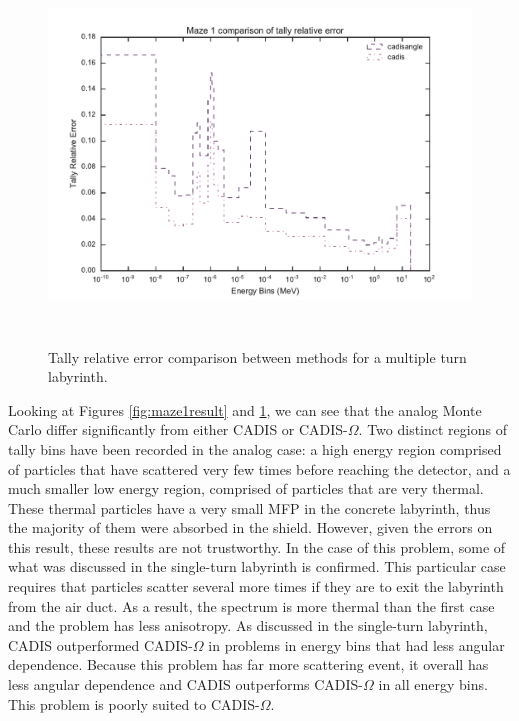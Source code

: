\begin{figure}[h!]
  \centering
  \includegraphics[height=10cm]{./chapters/characterization_probs/figures/char/maze1/maze_1_tally_error_compare.pdf}
  \caption[Tally relative error comparison between methods for multiple turn labyrinth]
  {Tally relative error comparison between methods for a multiple turn
  labyrinth. }
  \label{fig:maze1error}
\end{figure}

Looking at Figures \ref{fig:maze1result} and \ref{fig:maze1error}, we can see
that the analog Monte Carlo differ significantly from either CADIS or
CADIS-$\Omega$. Two distinct regions of tally bins have been recorded in the
analog case: a high energy region comprised of particles that have scattered
very few times before reaching the detector, and a much smaller low energy
region, comprised of particles that are very thermal. These thermal particles
have a very small MFP in the concrete labyrinth, thus the majority of them were
absorbed in the shield. However, given the errors on this result, these results are
not trustworthy. In the case of this problem, some of what was discussed in the
single-turn labyrinth is confirmed. This particular case requires that particles
scatter several more times if they are to exit the labyrinth from the air duct.
As a result, the spectrum is more thermal than the first case and the problem
has less anisotropy. As discussed in the single-turn labyrinth, CADIS
outperformed CADIS-$\Omega$ in problems in energy bins that had less angular
dependence. Because this problem has far more scattering event, it overall has
less angular dependence and CADIS outperforms CADIS-$\Omega$ in all energy bins.
This problem is poorly suited to CADIS-$\Omega$.

